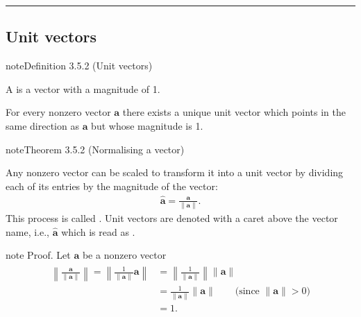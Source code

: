 \documentclass[letterpaper,10pt,english]{jupyterBook}
\begin{document}
\bigskip\hrule\bigskip


\ignorespaces 

\subsection{Unit vectors}
\label{\detokenize{_pages/3.2_Vector_magnitude:unit-vectors}}\label{\detokenize{_pages/3.2_Vector_magnitude:index-1}}\label{_pages/3.2_Vector_magnitude:unit-vector-definition}
\begin{sphinxadmonition}{note}{Definition 3.5.2 (Unit vectors)}



\sphinxAtStartPar
A  is a vector with a magnitude of 1.
\end{sphinxadmonition}

\sphinxAtStartPar
For every non\sphinxhyphen{}zero vector \(\mathbf{a}\) there exists a unique unit vector which points in the same direction as \(\mathbf{a}\) but whose magnitude is 1.

\ignorespaces \label{_pages/3.2_Vector_magnitude:normalising-a-vector-proposition}
\begin{sphinxadmonition}{note}{Theorem 3.5.2 (Normalising a vector)}



\sphinxAtStartPar
Any non\sphinxhyphen{}zero vector can be scaled to transform it into a unit vector by dividing each of its entries by the magnitude of the vector:
\begin{equation}\label{equation:_pages/3.2_Vector_magnitude:normalising-a-vector-equation}
\begin{split} \hat{\mathbf{a}} = \frac{\mathbf{a}}{\|\mathbf{a}\|}. \end{split}
\end{equation}
\sphinxAtStartPar
This process is called . Unit vectors are denoted with a caret above the vector name, i.e., \(\hat{\mathbf{a}}\) which is read as .
\end{sphinxadmonition}

\begin{sphinxadmonition}{note}
\sphinxAtStartPar
Proof. Let \(\mathbf{a}\) be a non\sphinxhyphen{}zero vector
\begin{equation*}
\begin{split} \begin{align*}
    \left\|\frac{\mathbf{a}}{\|\mathbf{a}\|}\right\| = \left\|\frac{1}{\|\mathbf{a}\|}\mathbf{a}\right\| &= \left\|\frac{1}{\|\mathbf{a}\|}\right\| \|\mathbf{a}\| \\
    &= \frac{1}{\|\mathbf{a}\|} \|\mathbf{a}\| \qquad \text{(since $\|\mathbf{a}\|>0$)}\\
    &= 1.
\end{align*} \end{split}
\end{equation*}\end{sphinxadmonition}
\end{document}
